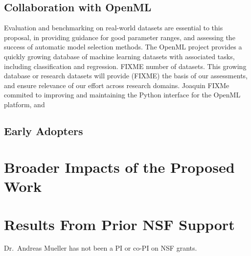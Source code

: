 \subsection{Collaboration with OpenML}
Evaluation and benchmarking on real-world datasets are essential to this proposal, in providing
guidance for good parameter ranges, and assessing the success of automatic model selection methods.
The OpenML project provides a quickly growing database of machine learning datasets with associated
tasks, including classification and regression. FIXME number of datasets.
This growing database or research datasets will provide (FIXME) the basis of our assessments, and
ensure relevance of our effort across research domains.
Joaquin FIXMe commited to improving and maintaining the Python interface for the OpenML platform,
and 

\subsection{Early Adopters}

\section{Broader Impacts of the Proposed Work}

\section{Results From Prior NSF Support}
Dr.\ Andreas Mueller has not been a PI or co-PI on NSF grants.


